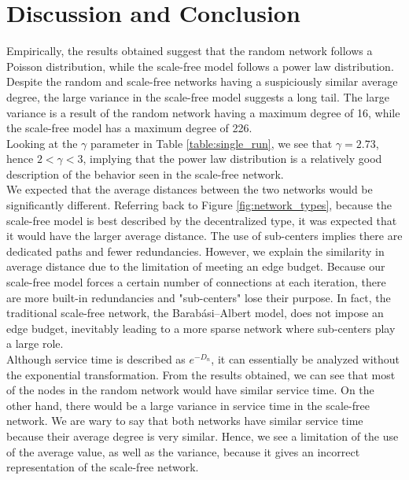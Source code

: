 \documentclass[journal]{IEEEtran}
\begin{document}
\section{Discussion and Conclusion}

\noindent Empirically, the results obtained suggest that the random network follows a Poisson distribution, while the scale-free model follows a power law distribution. Despite the random and scale-free networks having a suspiciously similar average degree, the large variance in the scale-free model suggests a long tail. The large variance is a result of the random network having a maximum degree of 16, while the scale-free model has a maximum degree of 226. \\

\noindent Looking at the $\gamma$ parameter in Table \ref{table:single_run}, we see that $\gamma = 2.73$, hence $2 < \gamma < 3$, implying that the power law distribution is a relatively good description of the behavior seen in the scale-free network.\\

\noindent We expected that the average distances between the two networks would be significantly different. Referring back to Figure \ref{fig:network_types}, because the scale-free model is best described by the decentralized type, it was expected that it would have the larger average distance. The use of sub-centers implies there are dedicated paths and fewer redundancies. However, we explain the similarity in average distance due to the limitation of meeting an edge budget. Because our scale-free model forces a certain number of connections at each iteration, there are more built-in redundancies and "sub-centers" lose their purpose. In fact, the traditional scale-free network, the Barabási–Albert model, does not impose an edge budget, inevitably leading to a more sparse network where sub-centers play a large role. \\

\noindent Although service time is described as $e^{-D_n}$, it can essentially be analyzed without the exponential transformation. From the results obtained, we can see that most of the nodes in the random network would have similar service time. On the other hand, there would be a large variance in service time in the scale-free network. We are wary to say that both networks have similar service time because their average degree is very similar. Hence, we see a limitation of the use of the average value, as well as the variance, because it gives an incorrect representation of the scale-free network. \\
\end{document}
